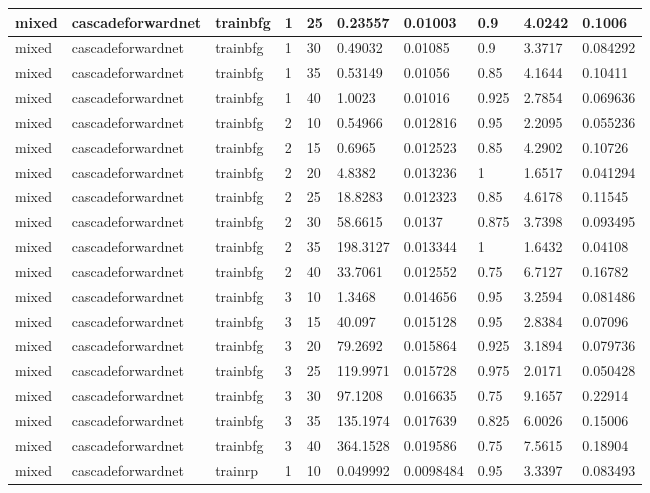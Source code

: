 \begin{longtable}{lllllllll}
mixed & cascadeforwardnet & trainbfg & 1 & 25 & 0.23557 & 0.01003 & 0.9 & 4.0242 & 0.1006 \\ \hline 
mixed & cascadeforwardnet & trainbfg & 1 & 30 & 0.49032 & 0.01085 & 0.9 & 3.3717 & 0.084292 \\ \hline 
mixed & cascadeforwardnet & trainbfg & 1 & 35 & 0.53149 & 0.01056 & 0.85 & 4.1644 & 0.10411 \\ \hline 
mixed & cascadeforwardnet & trainbfg & 1 & 40 & 1.0023 & 0.01016 & 0.925 & 2.7854 & 0.069636 \\ \hline 
mixed & cascadeforwardnet & trainbfg & 2 & 10 & 0.54966 & 0.012816 & 0.95 & 2.2095 & 0.055236 \\ \hline 
mixed & cascadeforwardnet & trainbfg & 2 & 15 & 0.6965 & 0.012523 & 0.85 & 4.2902 & 0.10726 \\ \hline 
mixed & cascadeforwardnet & trainbfg & 2 & 20 & 4.8382 & 0.013236 & 1 & 1.6517 & 0.041294 \\ \hline 
mixed & cascadeforwardnet & trainbfg & 2 & 25 & 18.8283 & 0.012323 & 0.85 & 4.6178 & 0.11545 \\ \hline 
mixed & cascadeforwardnet & trainbfg & 2 & 30 & 58.6615 & 0.0137 & 0.875 & 3.7398 & 0.093495 \\ \hline 
mixed & cascadeforwardnet & trainbfg & 2 & 35 & 198.3127 & 0.013344 & 1 & 1.6432 & 0.04108 \\ \hline 
mixed & cascadeforwardnet & trainbfg & 2 & 40 & 33.7061 & 0.012552 & 0.75 & 6.7127 & 0.16782 \\ \hline 
mixed & cascadeforwardnet & trainbfg & 3 & 10 & 1.3468 & 0.014656 & 0.95 & 3.2594 & 0.081486 \\ \hline 
mixed & cascadeforwardnet & trainbfg & 3 & 15 & 40.097 & 0.015128 & 0.95 & 2.8384 & 0.07096 \\ \hline 
mixed & cascadeforwardnet & trainbfg & 3 & 20 & 79.2692 & 0.015864 & 0.925 & 3.1894 & 0.079736 \\ \hline 
mixed & cascadeforwardnet & trainbfg & 3 & 25 & 119.9971 & 0.015728 & 0.975 & 2.0171 & 0.050428 \\ \hline 
mixed & cascadeforwardnet & trainbfg & 3 & 30 & 97.1208 & 0.016635 & 0.75 & 9.1657 & 0.22914 \\ \hline 
mixed & cascadeforwardnet & trainbfg & 3 & 35 & 135.1974 & 0.017639 & 0.825 & 6.0026 & 0.15006 \\ \hline 
mixed & cascadeforwardnet & trainbfg & 3 & 40 & 364.1528 & 0.019586 & 0.75 & 7.5615 & 0.18904 \\ \hline 
mixed & cascadeforwardnet & trainrp & 1 & 10 & 0.049992 & 0.0098484 & 0.95 & 3.3397 & 0.083493 \\ \hline 

\end{longtable}
